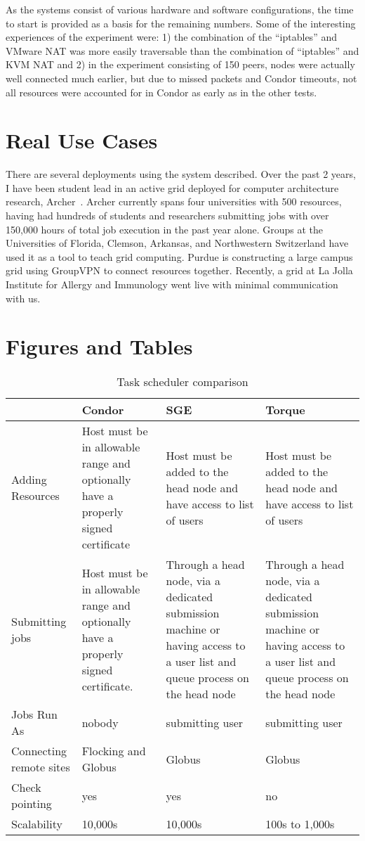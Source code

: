 As the systems consist of various hardware and software configurations, the
time to start is provided as a basis for the remaining numbers.  Some of the
interesting experiences of the experiment were:  1) the combination of the
``iptables'' and VMware NAT was more easily traversable than the combination
of ``iptables'' and KVM NAT and 2) in the experiment consisting of 150 peers,
nodes were actually well connected much earlier, but due to missed packets and
Condor timeouts, not all resources were accounted for in Condor as early as in
the other tests.

\section{Real Use Cases}
There are several deployments using the system described.  Over the past 2
years, I have been student lead in an active grid deployed for computer
architecture research, Archer~\cite{archer}.  Archer currently spans four
universities with 500 resources, having had hundreds of students and
researchers submitting jobs with over 150,000 hours of total job execution in
the past year alone.  Groups at the Universities of Florida, Clemson, Arkansas,
and Northwestern Switzerland have used it as a tool to teach grid computing.
Purdue is constructing a large campus grid using GroupVPN to connect resources
together.  Recently, a grid at La Jolla Institute for Allergy and Immunology
went live with minimal communication with us.

\section{Figures and Tables}

\begin{table}[ht]
\centering
\caption{Task scheduler comparison}
\label{tab:task_schedulers}
\begin{tabular}{|p{1in}||p{1.675in}|p{1.675in}|p{1.675in}|} \hline
& Condor & SGE & Torque \\\hline
Adding Resources
&
Host must be in allowable range and optionally have a properly signed certificate
&
Host must be added to the head node and have access to list of users
&
Host must be added to the head node and have access to list of users
\\\hline
Submitting jobs
&
Host must be in allowable range and optionally have a properly signed certificate.
&
Through a head node, via a dedicated submission machine or having access to a user
list and queue process on the head node
&
Through a head node, via a dedicated submission machine or having access to a user
list and queue process on the head node
\\\hline
Jobs Run As
&
nobody
&
submitting user
&
submitting user
\\\hline
Connecting remote sites
&
Flocking and Globus
&
Globus
&
Globus
\\\hline
Check pointing
&
yes
&
yes
&
no
\\\hline
Scalability
&
10,000s
&
10,000s
&
100s to 1,000s
\\\hline
\end{tabular}
\end{table}

